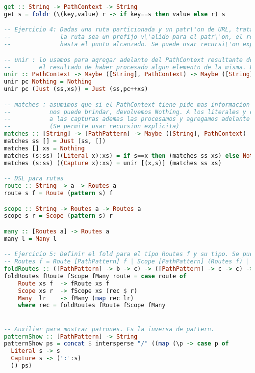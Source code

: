 \documentclass[10pt,a4paper]{article}
\begin{document}
\begin{lstlisting}[language=Haskell,breaklines=true,basicstyle=\tiny]
get :: String -> PathContext -> String
get s = foldr (\(key,value) r -> if key==s then value else r) s

-- Ejercicio 4: Dadas una ruta particionada y un patr\'on de URL, trata de aplicar el patr\'on a la ruta y devuelve, en caso de que
--              la ruta sea un prefijo v\'alido para el patr\'on, el resto de la ruta que no se haya llegado a consumir y el contexto capturado 
--              hasta el punto alcanzado. Se puede usar recursi\'on expl\'icita.

-- unir : lo usamos para agregar adelante del PathContext resultante del procesamiento de una ruta 
--        el resultado de haber procesado algun elemento de la misma. Lo utilizamos como funcion auxiliar de 'matches'
unir :: PathContext -> Maybe ([String], PathContext) -> Maybe ([String], PathContext)
unir pc Nothing = Nothing
unir pc (Just (ss,xs)) = Just (ss,pc++xs)

-- matches : asumimos que si el PathContext tiene pide mas informacion de la que la ruta
--           nos puede brindar, devolvemos Nothing. A los literales y capturas los consumimos, y
--           a las capturas ademas las procesamos y agregamos adelante en el resultado final, pues son los datos que debemos guardar.
--           (Se permite usar recursion explicita)
matches :: [String] -> [PathPattern] -> Maybe ([String], PathContext)
matches ss [] = Just (ss, [])
matches [] xs = Nothing
matches (s:ss) ((Literal x):xs) = if s==x then (matches ss xs) else Nothing
matches (s:ss) ((Capture x):xs) = unir [(x,s)] (matches ss xs)

-- DSL para rutas
route :: String -> a -> Routes a
route s f = Route (pattern s) f

scope :: String -> Routes a -> Routes a
scope s r = Scope (pattern s) r

many :: [Routes a] -> Routes a
many l = Many l

-- Ejercicio 5: Definir el fold para el tipo Routes f y su tipo. Se puede usar recursi\'on expl\'icita.
-- Routes f = Route [PathPattern] f | Scope [PathPattern] (Routes f) | Many [Routes f]
foldRoutes :: ([PathPattern] -> b -> c) -> ([PathPattern] -> c -> c) -> ([c] -> c) -> Routes b -> c
foldRoutes fRoute fScope fMany route = case route of
    Route xs f  -> fRoute xs f 
    Scope xs r  -> fScope xs (rec $ r)
    Many  lr    -> fMany (map rec lr)
    where rec = foldRoutes fRoute fScope fMany


-- Auxiliar para mostrar patrones. Es la inversa de pattern.
patternShow :: [PathPattern] -> String
patternShow ps = concat $ intersperse "/" ((map (\p -> case p of
  Literal s -> s
  Capture s -> (':':s)
  )) ps)



\end{lstlisting}
\end{document}

